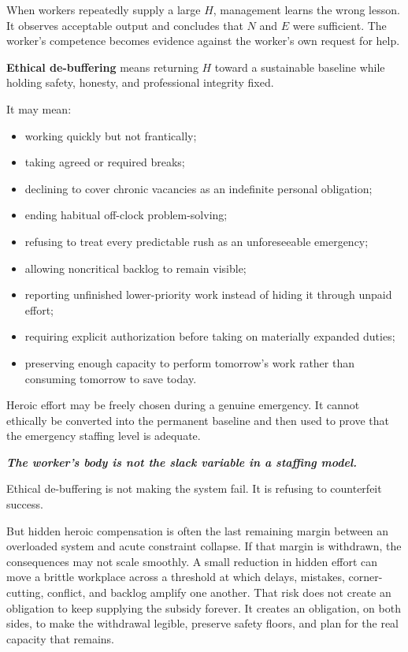 \documentclass[11pt,oneside]{article}
\providecommand{\tightlist}{%
  \setlength{\itemsep}{0.22em}\setlength{\parskip}{0pt}}
\renewenvironment{quote}
  {\begin{tcolorbox}[
      enhanced,
      breakable,
      colback=ManifestLight,
      colframe=ManifestRule,
      boxrule=0pt,
      leftrule=3pt,
      arc=0pt,
      outer arc=0pt,
      left=10pt,right=10pt,top=8pt,bottom=8pt,
      before skip=0.8em,after skip=0.8em
    ]\itshape}
  {\end{tcolorbox}}
\begin{document}
When workers repeatedly supply a large \(H\), management learns the
wrong lesson. It observes acceptable output and concludes that \(N\) and
\(E\) were sufficient. The worker's competence becomes evidence against
the worker's own request for help.

\textbf{Ethical de-buffering} means returning \(H\) toward a sustainable
baseline while holding safety, honesty, and professional integrity
fixed.

It may mean:

\begin{itemize}
\tightlist
\item
  working quickly but not frantically;
\item
  taking agreed or required breaks;
\item
  declining to cover chronic vacancies as an indefinite personal
  obligation;
\item
  ending habitual off-clock problem-solving;
\item
  refusing to treat every predictable rush as an unforeseeable
  emergency;
\item
  allowing noncritical backlog to remain visible;
\item
  reporting unfinished lower-priority work instead of hiding it through
  unpaid effort;
\item
  requiring explicit authorization before taking on materially expanded
  duties;
\item
  preserving enough capacity to perform tomorrow's work rather than
  consuming tomorrow to save today.
\end{itemize}

Heroic effort may be freely chosen during a genuine emergency. It cannot
ethically be converted into the permanent baseline and then used to
prove that the emergency staffing level is adequate.

\begin{quote}
\textbf{The worker's body is not the slack variable in a staffing
model.}
\end{quote}

Ethical de-buffering is not making the system fail. It is refusing to
counterfeit success.

But hidden heroic compensation is often the last remaining margin
between an overloaded system and acute constraint collapse. If that
margin is withdrawn, the consequences may not scale smoothly. A small
reduction in hidden effort can move a brittle workplace across a
threshold at which delays, mistakes, corner-cutting, conflict, and
backlog amplify one another. That risk does not create an obligation to
keep supplying the subsidy forever. It creates an obligation, on both
sides, to make the withdrawal legible, preserve safety floors, and plan
for the real capacity that remains.
\end{document}
